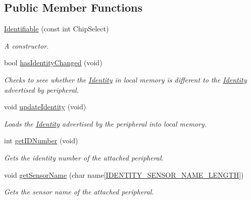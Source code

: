 \subsection*{Public Member Functions}
\begin{DoxyCompactItemize}
\item 
\mbox{\hyperlink{class_identifiable_a107ce612ee60e9be98085abdfbfdc83e}{Identifiable}} (const int Chip\+Select)
\begin{DoxyCompactList}\small\item\em A constructor. \end{DoxyCompactList}\item 
bool \mbox{\hyperlink{class_identifiable_adbc1a3f62e543a0df002a43413998a26}{has\+Identity\+Changed}} (void)
\begin{DoxyCompactList}\small\item\em Checks to seee whether the \mbox{\hyperlink{struct_identity}{Identity}} in local memory is different to the \mbox{\hyperlink{struct_identity}{Identity}} advertised by peripheral. \end{DoxyCompactList}\item 
void \mbox{\hyperlink{class_identifiable_ae99f8914426041ea02932d0ed00b29c3}{update\+Identity}} (void)
\begin{DoxyCompactList}\small\item\em Loads the \mbox{\hyperlink{struct_identity}{Identity}} advertised by the peripheral into local memory. \end{DoxyCompactList}\item 
int \mbox{\hyperlink{class_identifiable_a85d8439d79bd15eeb1c40d694d3d49ae}{get\+I\+D\+Number}} (void)
\begin{DoxyCompactList}\small\item\em Gets the identity number of the attached peripheral. \end{DoxyCompactList}\item 
void \mbox{\hyperlink{class_identifiable_a7942e337c1303ce42cc822032465c66a}{get\+Sensor\+Name}} (char name\mbox{[}\mbox{\hyperlink{_s_p_i___instruction_set_8h_addd001d124aca0fe92b3e484732fb7c8}{I\+D\+E\+N\+T\+I\+T\+Y\+\_\+\+S\+E\+N\+S\+O\+R\+\_\+\+N\+A\+M\+E\+\_\+\+L\+E\+N\+G\+TH}}\mbox{]})
\begin{DoxyCompactList}\small\item\em Gets the sensor name of the attached peripheral. \end{DoxyCompactList}\end{DoxyCompactItemize}


